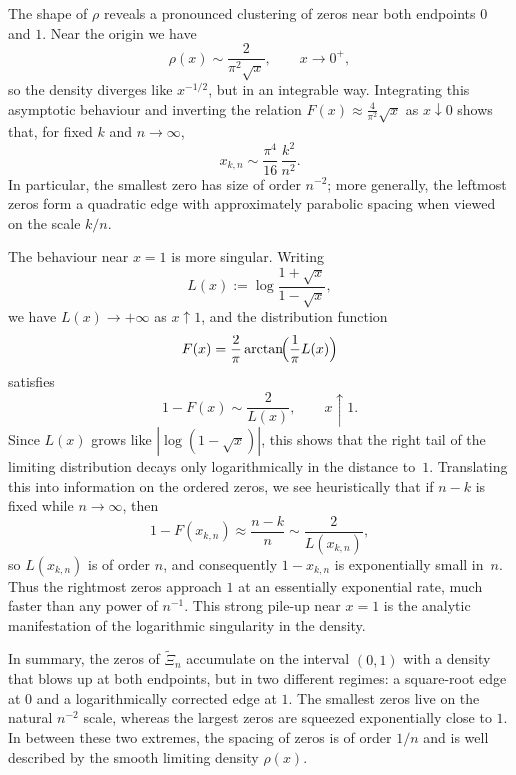 \documentclass[12pt,twoside]{article}
\begin{document}
\vspace{0.2cm}

The shape of $\rho$ reveals a pronounced clustering of zeros near both endpoints $0$ and $1$. Near the origin we have
\[
  \rho(x)\sim \frac{2}{\pi^2\sqrt{x}},\qquad x\rightarrow 0^+,
\]
so the density diverges like $x^{-1/2}$, but in an integrable way. Integrating this asymptotic behaviour and inverting the relation $F(x)\approx \tfrac{4}{\pi^2}\sqrt{x}$ as $x\downarrow0$ shows that, for fixed $k$ and $n\to\infty$,
\[
  x_{k,n}\sim \frac{\pi^4}{16}\,\frac{k^2}{n^2}.
\]
In particular, the smallest zero has size of order $n^{-2}$; more generally, the leftmost zeros form a quadratic edge with approximately parabolic spacing when viewed on the scale $k/n$.

\vspace{0.2cm}

The behaviour near $x=1$ is more singular. Writing
\[
  L(x):=\log\frac{1+\sqrt{x}}{1-\sqrt{x}},
\]
we have $L(x)\to+\infty$ as $x\uparrow1$, and the distribution function
\[
  F(x)=\frac{2}{\pi}\arctan\!\Bigl(\frac{1}{\pi}L(x)\Bigr)
\]
satisfies
\[
  1-F(x)\sim \frac{2}{L(x)},\qquad x\uparrow 1.
\]
Since $L(x)$ grows like $|\log(1-\sqrt{x})|$, this shows that the right tail of the limiting distribution decays only logarithmically in the distance to~$1$. Translating this into information on the ordered zeros, we see heuristically that if $n-k$ is fixed while $n\to\infty$, then
\[
  1-F(x_{k,n})\approx \frac{n-k}{n}\sim \frac{2}{L(x_{k,n})},
\]
so $L(x_{k,n})$ is of order $n$, and consequently $1-x_{k,n}$ is exponentially small in~$n$. Thus the rightmost zeros approach $1$ at an essentially exponential rate, much faster than any power of $n^{-1}$. This strong pile-up near $x=1$ is the analytic manifestation of the logarithmic singularity in the density.

\vspace{0.2cm}

In summary, the zeros of $\widetilde{\Xi}_n$ accumulate on the interval $(0,1)$ with a density that blows up at both endpoints, but in two different regimes: a square-root edge at $0$ and a logarithmically corrected edge at $1$. The smallest zeros live on the natural $n^{-2}$ scale, whereas the largest zeros are squeezed exponentially close to $1$. In between these two extremes, the spacing of zeros is of order $1/n$ and is well described by the smooth limiting density $\rho(x)$.

\vspace{0.4cm}
\end{document}
